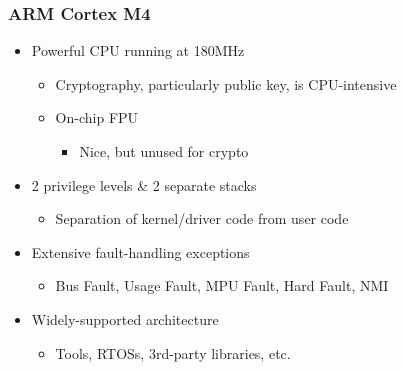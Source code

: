 \subsubsection{ARM Cortex M4}
\begin{itemize}
  \item Powerful CPU running at 180MHz
        \begin{itemize}
          \item Cryptography, particularly public key, is CPU-intensive
          \item On-chip FPU
                \begin{itemize}
                  \item Nice, but unused for crypto
                \end{itemize}
        \end{itemize}
  \item 2 privilege levels \& 2 separate stacks
        \begin{itemize}
          \item Separation of kernel/driver code from user code
        \end{itemize}
  \item Extensive fault-handling exceptions
        \begin{itemize}
          \item Bus Fault, Usage Fault, MPU Fault, Hard Fault, NMI
        \end{itemize}
  \item Widely-supported architecture
        \begin{itemize}
          \item Tools, RTOSs, 3rd-party libraries, etc.
        \end{itemize}
\end{itemize}

